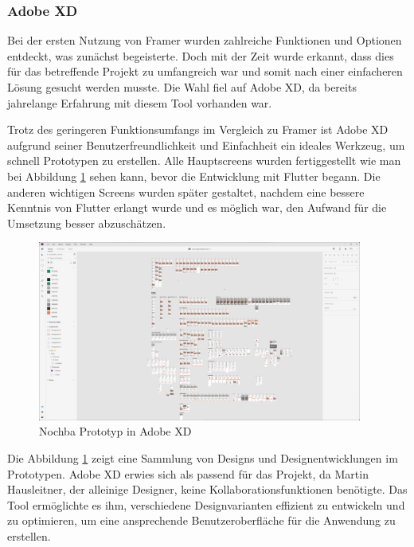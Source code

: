 \subsubsection{Adobe XD}
Bei der ersten Nutzung von Framer wurden zahlreiche Funktionen und Optionen entdeckt, was zunächst begeisterte. Doch mit der Zeit wurde erkannt, dass dies für das betreffende Projekt zu umfangreich war und somit nach einer einfacheren Lösung gesucht werden musste. Die Wahl fiel auf Adobe XD, da bereits jahrelange Erfahrung mit diesem Tool vorhanden war.

Trotz des geringeren Funktionsumfangs im Vergleich zu Framer
ist Adobe XD aufgrund seiner Benutzerfreundlichkeit und
Einfachheit ein ideales Werkzeug, um schnell Prototypen zu
erstellen. Alle Hauptscreens wurden fertiggestellt wie man
bei Abbildung \ref{fig:adobexd-prototyp} sehen kann, bevor
die Entwicklung mit Flutter begann. Die anderen wichtigen
Screens wurden später gestaltet, nachdem eine bessere
Kenntnis von Flutter erlangt wurde und es möglich war, den
Aufwand für die Umsetzung besser abzuschätzen.

\begin{figure}[H]
  \centering
  \includegraphics[width=0.95\textwidth]{pics/nochba-adobe-xd-protoype-screenshot.png}
  \caption{Nochba Prototyp in Adobe XD}
  \label{fig:adobexd-prototyp}
\end{figure}

Die Abbildung \ref{fig:adobexd-prototyp} zeigt eine Sammlung von Designs und Designentwicklungen im Prototypen. Adobe XD erwies sich als passend für das Projekt, da Martin Hausleitner, der alleinige Designer, keine Kollaborationsfunktionen benötigte. Das Tool ermöglichte es ihm, verschiedene Designvarianten effizient zu entwickeln und zu optimieren, um eine ansprechende Benutzeroberfläche für die Anwendung zu erstellen.

